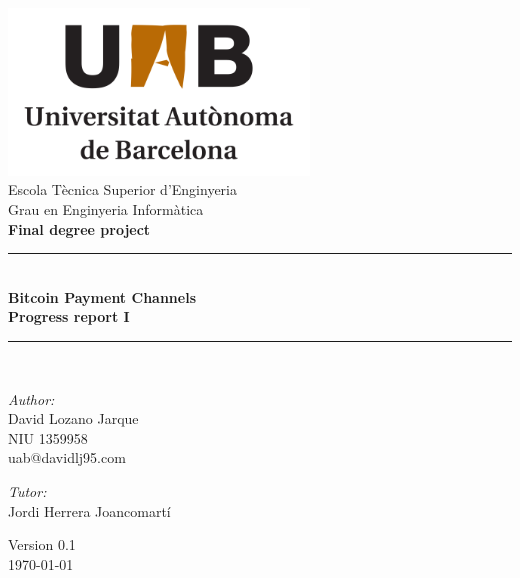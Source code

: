 \documentclass[a4paper,12pt,openany]{report}
\begin{document}

\begin{titlepage}
\begin{center}

\includegraphics[width=0.6\textwidth]{uab_logo}\\[1cm]

{\large Escola Tècnica Superior d'Enginyeria}\\[0.5cm]

{\large Grau en Enginyeria Informàtica}\\[0.5cm]

{\large \textbf{Final degree project}}\\[0.5cm]

\rule{\linewidth}{0.5mm} \\[0.4cm]
{ \huge \bfseries Bitcoin Payment Channels \\[0.4cm] }
{ \large \bfseries Progress report I}
\rule{\linewidth}{0.5mm} \\[1.5cm]

\noindent
\begin{minipage}{0.4\textwidth}
  \begin{flushleft} \large
    \emph{Author:}\\
    David Lozano Jarque\\
    NIU 1359958\\
    uab@davidlj95.com
  \end{flushleft}
\end{minipage}%
\begin{minipage}{0.4\textwidth}
  \begin{flushright} \large
    \emph{Tutor:} \\
    Jordi Herrera Joancomartí\\
  \end{flushright}
\end{minipage}

\vfill

{\large Version 0.1\\ \today}

\end{center}
\end{titlepage}
\end{document}
